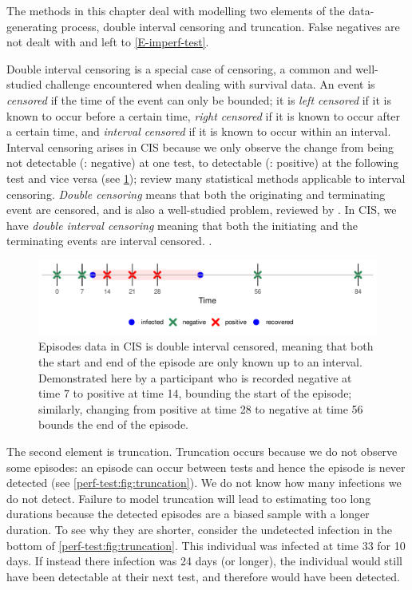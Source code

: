 \documentclass[thesis.tex]{subfiles}
\begin{document}
The methods in this chapter deal with modelling two elements of the data-generating process, double interval censoring and truncation.
False negatives are not dealt with and left to \cref{E-imperf-test}.

Double interval censoring is a special case of censoring, a common and well-studied challenge encountered when dealing with survival data.
An event is \emph{censored} if the time of the event can only be bounded; it is \emph{left censored} if it is known to occur before a certain time, \emph{right censored} if it is known to occur after a certain time, and \emph{interval censored} if it is known to occur within an interval.
Interval censoring arises in CIS because we only observe the change from being not detectable (\ie: negative) at one test, to detectable (\ie: positive) at the following test and vice versa (see \cref{perf-test:fig:double-interval-censor}); \textcite{bogaertsSurvival} review many statistical methods applicable to interval censoring.
\emph{Double censoring} means that both the originating and terminating event are censored, and is also a well-studied problem, reviewed by \textcite{sunStatisticala}.
In CIS, we have \emph{double interval censoring} meaning that both the initiating and the terminating events are interval censored.
.
\begin{figure}
  \centering \includegraphics{cis-perfect-testing/double-interval-censor}
  \caption{Episodes data in CIS is double interval censored, meaning that both the start and end of the episode are only known up to an interval. Demonstrated here by a participant who is recorded negative at time 7 to positive at time 14, bounding the start of the episode; similarly, changing from positive at time 28 to negative at time 56 bounds the end of the episode. \label{perf-test:fig:double-interval-censor}}
\end{figure}

The second element is truncation.
Truncation occurs because we do not observe some episodes: an episode can occur between tests and hence the episode is never detected (see \cref{perf-test:fig:truncation}).
We do not know how many infections we do not detect.
Failure to model truncation will lead to estimating too long durations because the detected episodes are a biased sample with a longer duration.
To see why they are shorter, consider the undetected infection in the bottom of \cref{perf-test:fig:truncation}.
This individual was infected at time 33 for 10 days.
If instead there infection was 24 days (or longer), the individual would still have been detectable at their next test, and therefore would have been detected.
\end{document}
